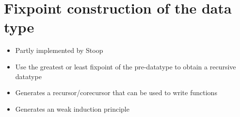 \section{Fixpoint construction of the data type}\label{sec:fixpoint}

\begin{itemize}
\item{Partly implemented by Stoop~\cite{mrbnf_fixpoint}}
\item{Use the greatest or least fixpoint of the pre-datatype to obtain a recursive datatype}
\item{Generates a recursor/corecursor that can be used to write functions}
\item{Generates an weak induction principle}
\end{itemize}
